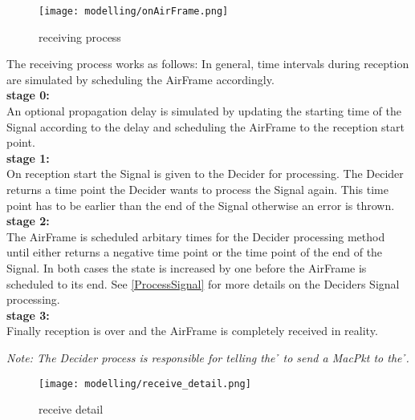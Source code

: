 \begin{figure}[H]
 \centering
 \texttt{[image: modelling/onAirFrame.png]}
 \caption{receiving process}
 \label{fig: receiving process}
\end{figure}


The receiving process works as follows: In general, time intervals during
reception are simulated by scheduling the AirFrame accordingly.\\

\textbf{stage 0:}\\
An optional propagation delay is simulated by updating the starting time of the
Signal according to the delay and scheduling the AirFrame to
the reception start point.\\

\textbf{stage 1:}\\
On reception start the Signal is given to the Decider for processing. The
Decider returns a time point the Decider wants to process the Signal again.
This time point has to be earlier than the end of the Signal otherwise an error
is thrown. \\

\textbf{stage 2:}\\
The AirFrame is scheduled arbitary times for the Decider processing method
until either returns a negative time point or the time point of the end of the
Signal. In both cases the state is increased by one before the AirFrame is
scheduled to its end. See \ref{ProcessSignal} for more details on the Deciders
Signal processing. \\

\textbf{stage 3:}\\
Finally reception is over and the AirFrame is completely received in reality.

\emph{Note: The Decider process is responsible for telling the \h{\bp} to send
a MacPkt to the \h{\bm}.}

\begin{figure}[H]
 \centering
 \texttt{[image: modelling/receive\_detail.png]}
 \caption{receive detail}
 \label{fig: receive detail}
\end{figure}







